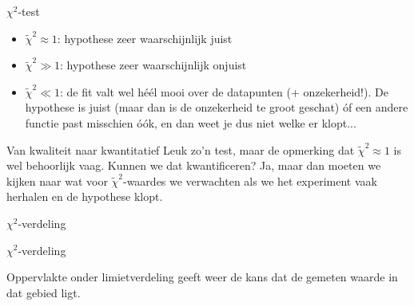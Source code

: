 \documentclass{beamer}
\newcommand{\rchisq}{\tilde\chi^2}
\begin{document}
\begin{frame}{$\chi^2$-test}
  \begin{itemize}
    \item $\rchisq \approx 1$: hypothese zeer waarschijnlijk juist
    \item $\rchisq \gg 1$: hypothese zeer waarschijnlijk onjuist
    \item $\rchisq \ll 1$: de fit valt wel héél mooi over de datapunten (+ onzekerheid!). De hypothese is juist (maar dan is de onzekerheid te groot geschat) óf een andere functie past misschien óók, en dan weet je dus niet welke er klopt...
  \end{itemize}
\end{frame}

\begin{frame}{Van kwaliteit naar kwantitatief}
  Leuk zo'n test, maar de opmerking dat $\rchisq \approx 1$ is wel behoorlijk vaag. Kunnen we dat kwantificeren? Ja, maar dan moeten we kijken naar wat voor $\rchisq$-waardes we verwachten als we het experiment vaak herhalen en de hypothese klopt.
\end{frame}

\begin{frame}{$\chi^2$-verdeling}
  \begin{center}





  \end{center}
\end{frame}

\begin{frame}{$\chi^2$-verdeling}
  \begin{center}




  \end{center}
  Oppervlakte onder limietverdeling geeft weer de kans dat de gemeten waarde in dat gebied ligt.
\end{frame}
\end{document}
